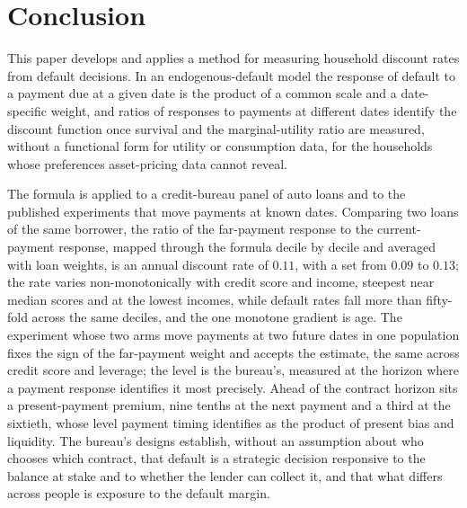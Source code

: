 \section{Conclusion}\label{sec:conclusion}

This paper develops and applies a method for measuring household discount rates from default decisions. In an endogenous-default model the response of default to a payment due at a given date is the product of a common scale and a date-specific weight, and ratios of responses to payments at different dates identify the discount function once survival and the marginal-utility ratio are measured, without a functional form for utility or consumption data, for the households whose preferences asset-pricing data cannot reveal.

The formula is applied to a credit-bureau panel of auto loans and to the published experiments that move payments at known dates. Comparing two loans of the same borrower, the ratio of the far-payment response to the current-payment response, mapped through the formula decile by decile and averaged with loan weights, is an annual discount rate of $0.11$, with a set from $0.09$ to $0.13$; the rate varies non-monotonically with credit score and income, steepest near median scores and at the lowest incomes, while default rates fall more than fifty-fold across the same deciles, and the one monotone gradient is age. The experiment whose two arms move payments at two future dates in one population fixes the sign of the far-payment weight and accepts the estimate, the same across credit score and leverage; the level is the bureau's, measured at the horizon where a payment response identifies it most precisely. Ahead of the contract horizon sits a present-payment premium, nine tenths at the next payment and a third at the sixtieth, whose level payment timing identifies as the product of present bias and liquidity. The bureau's designs establish, without an assumption about who chooses which contract, that default is a strategic decision responsive to the balance at stake and to whether the lender can collect it, and that what differs across people is exposure to the default margin.
